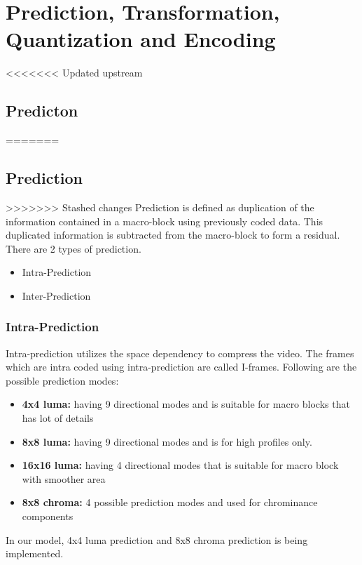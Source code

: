 
\chapter{Prediction, Transformation, Quantization and Encoding} %
\label{Chapter3}

<<<<<<< Updated upstream
\section{Predicton}
=======
\section{Prediction}
>>>>>>> Stashed changes
Prediction is defined as duplication of the information contained in a macro-block using previously coded data. This duplicated information is subtracted from the macro-block to form a residual. There are 2 types of prediction.

\begin{itemize}
	\item Intra-Prediction
	\item Inter-Prediction
\end{itemize}

\subsection{Intra-Prediction}
Intra-prediction utilizes the space dependency to compress the video. The frames which are intra coded using intra-prediction are called I-frames. Following are the possible prediction modes:
\begin{itemize}
	\item \textbf{4x4 luma:} having 9 directional modes and is suitable for macro blocks that has lot of details
	\item \textbf{8x8 luma:} having 9 directional modes and is for high profiles only.
	\item \textbf{16x16 luma:} having 4 directional modes that is suitable for macro block with smoother area
	\item \textbf{8x8 chroma:} 4 possible prediction modes and used for chrominance components
\end{itemize}
In our model, 4x4 luma prediction and 8x8 chroma prediction is being implemented.

